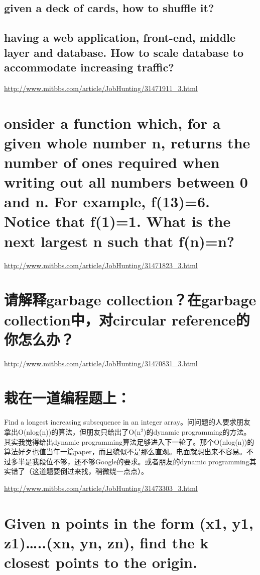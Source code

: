 \documentclass[12pt]{book}
\begin{document}
\subsection{given a deck of cards, how to shuffle it?}
\label{sec-24-2-1}

\subsection{having a web application, front-end, middle layer and database. How to scale database to accommodate increasing traffic?}
\label{sec-24-2-2}

\url{http://www.mitbbs.com/article/JobHunting/31471911_3.html}

\section{onsider a function which, for a given whole number n, returns the number of ones required when writing out all numbers between 0 and n. For example, f(13)=6. Notice that f(1)=1. What is the next largest n such that f(n)=n?}
\label{sec-24-3}

\url{http://www.mitbbs.com/article/JobHunting/31471823_3.html}

\section{请解释garbage collection？在garbage collection中，对circular reference的你怎么办？}
\label{sec-24-4}

\url{http://www.mitbbs.com/article/JobHunting/31470831_3.html}

\section{栽在一道编程题上：}
\label{sec-24-5}

Find a longest increasing subsequence in an integer array。问问题的人要求朋友拿出O(nlog(n))的算法，但朋友只给出了O(n$^{\text{2}}$)的dynamic programming的方法。其实我觉得给出dynamic programming算法足够进入下一轮了。那个O(nlog(n))的算法好歹也值当年一篇paper，而且貌似不是那么直观。电面就想出来不容易。不过多半是我段位不够，还不够Google的要求。或者朋友的dynamic programming其实错了（这道题要倒过来找，稍微绕一点点）。

\url{http://www.mitbbs.com/article/JobHunting/31473303_3.html}

\section{Given n points in the form (x1, y1, z1)…..(xn, yn, zn), find the k closest points to the origin.}
\label{sec-24-6}
\end{document}
